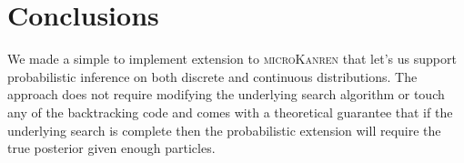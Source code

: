 \documentclass[
]{ceurart}
\begin{document}
\section{Conclusions}

We made a simple to implement extension to \textsc{microKanren} that
let's us support probabilistic inference on both discrete and
continuous distributions. The approach does not require modifying the
underlying search algorithm or touch any of the backtracking code and
comes with a theoretical guarantee that if the underlying search is
complete then the probabilistic extension will require the true
posterior given enough particles.



\end{document}

